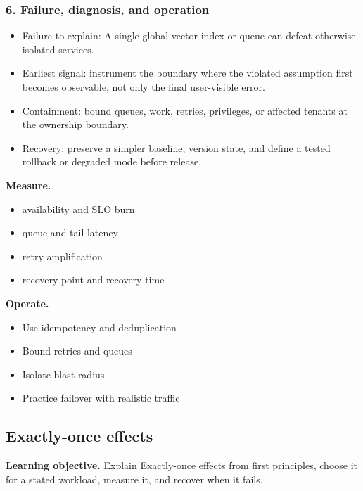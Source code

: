 \subsubsection*{6. Failure, diagnosis, and operation}
\begin{itemize}
\item Failure to explain: A single global vector index or queue can defeat otherwise isolated services.
\item Earliest signal: instrument the boundary where the violated assumption first becomes observable, not only the final user-visible error.
\item Containment: bound queues, work, retries, privileges, or affected tenants at the ownership boundary.
\item Recovery: preserve a simpler baseline, version state, and define a tested rollback or degraded mode before release.
\end{itemize}
\textbf{Measure.}\begin{itemize}
\item availability and SLO burn
\item queue and tail latency
\item retry amplification
\item recovery point and recovery time
\end{itemize}
\textbf{Operate.}\begin{itemize}
\item Use idempotency and deduplication
\item Bound retries and queues
\item Isolate blast radius
\item Practice failover with realistic traffic
\end{itemize}
\subsection{Exactly-once effects}
\textbf{Learning objective.} Explain Exactly-once effects from first principles, choose it for a stated workload, measure it, and recover when it fails.
